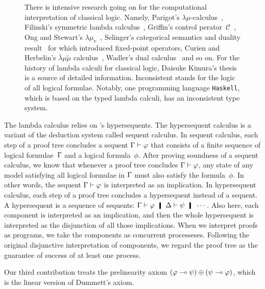 \begin{figure}
{  There is intensive research going on for the computational
  interpretation of classical logic.  Namely,
  Parigot's $\lambda\mu$-calculus~\citep{lambdamu},
  Filinski's symmetric lambda calculus~\citep{filinski1989},
  Griffin's control perator~$\mathcal C$~\citep{griffin1990},
  Ong and Stewart's $\lambda\mu_{\mathrm
  v}$~\citep{ong-stewart},
  Selinger's categorical semantics and duality
  result~\citep{selinger2001} for which \citet{kakutani2002} introduced
  fixed-point
  operators,
  Curien and Herbelin's $\bar\lambda\mu\tilde\mu$
  calculus~\citep{curien2000},
  Wadler's dual calculus~\citep{wadler-dual, wadler-reloaded} and so on.
  For the history of lambda calculi for classical logic,
  Daisuke Kimura's thesis~\cite{kimura} is a source of detailed
  information.
  \textsf{Inconsistent} stands for the logic of all logical formulae.
  Notably, one programming language \texttt{Haskell}, which is based on
  the typed lambda calculi, has
  an inconsistent type system.
  }
  \label{fig:lattice}
 \end{figure}

The lambda calculus relies on \citet{avron91}'s hypersequents.
The hypersequent calculus is a
variant of the deduction system called sequent calculus.  In sequent
calculus, each step of a proof tree concludes a sequent $\Gamma\vdash\varphi$ that
consists of a finite sequence of logical formulae~$\Gamma$ and a logical
formula~$\phi$.  After proving soundness of a sequent calculus, we know
that whenever a proof tree concludes $\Gamma\vdash\varphi$, any state of any model
satisfying all logical formulae in $\Gamma$ must also satisfy the
formula~$\phi$.  In other words, the sequent $\Gamma\vdash\varphi$ is
interpreted as an implication.  In hypersequent calculus, each step of a
proof tree concludes a hypersequent instead of a sequent.  A
hypersequent is a sequence of sequents: $\G\vdash\phi\hmid \D\vdash\psi
\hmid \cdots$.  Also here, each component is interpreted as an
implication, and then the whole hypersequent is interpreted as the
disjunction of all those implications.
When we interpret proofs as programs, we take the components as
concurrent processeses.  Following the original disjunctive
interpretation of components, we regard the proof tree as the guarantee of
success of at least one process.

Our third contribution treats the prelinearity axiom
$(\varphi\multimap\psi)\oplus(\psi\multimap\varphi)$, which is the linear version of
Dummett's axiom.

